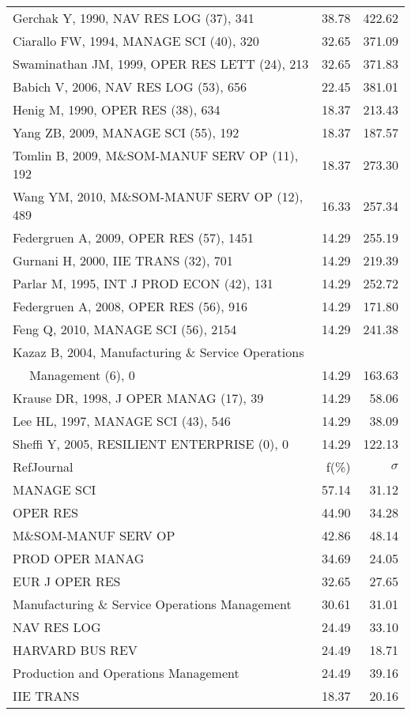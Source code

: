 \documentclass[a4paper,11pt]{report}
\begin{document}
\begin{landscape}
\begin{table}[!ht]
{\begin{tabular}{|l r r|}
Gerchak Y, 1990, NAV RES LOG (37), 341 & 38.78 & 422.62\\
Ciarallo FW, 1994, MANAGE SCI (40), 320 & 32.65 & 371.09\\
Swaminathan JM, 1999, OPER RES LETT (24), 213 & 32.65 & 371.83\\
Babich V, 2006, NAV RES LOG (53), 656 & 22.45 & 381.01\\
Henig M, 1990, OPER RES (38), 634 & 18.37 & 213.43\\
Yang ZB, 2009, MANAGE SCI (55), 192 & 18.37 & 187.57\\
Tomlin B, 2009, M\&SOM-MANUF SERV OP (11), 192 & 18.37 & 273.30\\
Wang YM, 2010, M\&SOM-MANUF SERV OP (12), 489 & 16.33 & 257.34\\
Federgruen A, 2009, OPER RES (57), 1451 & 14.29 & 255.19\\
Gurnani H, 2000, IIE TRANS (32), 701 & 14.29 & 219.39\\
Parlar M, 1995, INT J PROD ECON (42), 131 & 14.29 & 252.72\\
Federgruen A, 2008, OPER RES (56), 916 & 14.29 & 171.80\\
Feng Q, 2010, MANAGE SCI (56), 2154 & 14.29 & 241.38\\
Kazaz B, 2004, Manufacturing \& Service Operations &  & \\
$\quad$ Management (6), 0 & 14.29 & 163.63\\
Krause DR, 1998, J OPER MANAG (17), 39 & 14.29 & 58.06\\
Lee HL, 1997, MANAGE SCI (43), 546 & 14.29 & 38.09\\
Sheffi Y, 2005, RESILIENT ENTERPRISE (0), 0 & 14.29 & 122.13\\
\hline
\hline
RefJournal & f(\%) & $\sigma$\\
\hline
MANAGE SCI & 57.14 & 31.12\\
OPER RES & 44.90 & 34.28\\
M\&SOM-MANUF SERV OP & 42.86 & 48.14\\
PROD OPER MANAG & 34.69 & 24.05\\
EUR J OPER RES & 32.65 & 27.65\\
Manufacturing \& Service Operations Management & 30.61 & 31.01\\
NAV RES LOG & 24.49 & 33.10\\
HARVARD BUS REV & 24.49 & 18.71\\
Production and Operations Management & 24.49 & 39.16\\
IIE TRANS & 18.37 & 20.16\\
\hline
\end{tabular}
}
\end{table}

\end{landscape}
\end{document}
